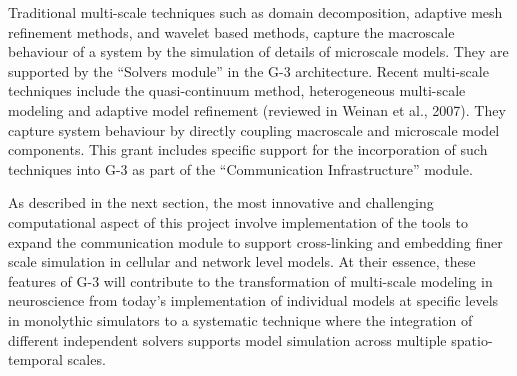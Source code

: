 \documentclass[12pt]{article}
\begin{document}

Traditional multi-scale techniques such as 
domain decomposition, adaptive mesh refinement methods, and wavelet
based methods, capture the macroscale behaviour of a system by the
simulation of details of microscale models.  They are supported by the
``Solvers module'' in the G-3 architecture.  Recent multi-scale
techniques include the quasi-continuum method, heterogeneous
multi-scale modeling and adaptive model refinement (reviewed in Weinan
et al., 2007).  They capture system behaviour by directly coupling
macroscale and microscale model components.  This grant includes
specific support for the incorporation of such techniques into G-3 as
part of the ``Communication Infrastructure'' module.

As described in the next section, the most innovative and challenging
computational aspect of this project involve implementation of the
tools to expand the communication module to support cross-linking and
embedding finer scale simulation in cellular and network level models.
At their essence, these features of G-3 will contribute to the
transformation of multi-scale modeling in neuroscience from today's
implementation of individual models at specific levels in monolythic
simulators to a systematic technique where the integration of
different independent solvers supports model simulation across
multiple spatio-temporal scales.
\end{document}
